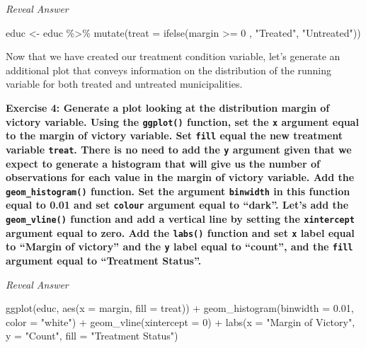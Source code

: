 \documentclass[
  letterpaper,
  DIV=11,
  numbers=noendperiod]{scrreprt}
\newenvironment{Shaded}{\begin{snugshade}}{\end{snugshade}}
\newcommand{\AttributeTok}[1]{\textcolor[rgb]{0.40,0.45,0.13}{#1}}
\newcommand{\DecValTok}[1]{\textcolor[rgb]{0.68,0.00,0.00}{#1}}
\newcommand{\FloatTok}[1]{\textcolor[rgb]{0.68,0.00,0.00}{#1}}
\newcommand{\FunctionTok}[1]{\textcolor[rgb]{0.28,0.35,0.67}{#1}}
\newcommand{\NormalTok}[1]{\textcolor[rgb]{0.00,0.23,0.31}{#1}}
\newcommand{\OtherTok}[1]{\textcolor[rgb]{0.00,0.23,0.31}{#1}}
\newcommand{\SpecialCharTok}[1]{\textcolor[rgb]{0.37,0.37,0.37}{#1}}
\newcommand{\StringTok}[1]{\textcolor[rgb]{0.13,0.47,0.30}{#1}}
\begin{document}
\hfill\break

\emph{Reveal Answer}

\begin{Shaded}
\begin{Highlighting}[]
\NormalTok{educ }\OtherTok{\textless{}{-}}\NormalTok{ educ }\SpecialCharTok{\%\textgreater{}\%} 
  \FunctionTok{mutate}\NormalTok{(}\AttributeTok{treat =} \FunctionTok{ifelse}\NormalTok{(margin }\SpecialCharTok{\textgreater{}=} \DecValTok{0}\NormalTok{ , }\StringTok{"Treated"}\NormalTok{, }\StringTok{"Untreated"}\NormalTok{))}
\end{Highlighting}
\end{Shaded}

Now that we have created our treatment condition variable, let's
generate an additional plot that conveys information on the distribution
of the running variable for both treated and untreated municipalities.

\hfill\break

\textbf{Exercise 4: Generate a plot looking at the distribution margin
of victory variable. Using the \texttt{ggplot()} function, set the
\texttt{x} argument equal to the margin of victory variable. Set
\texttt{fill} equal the new treatment variable \texttt{treat}. There is
no need to add the \texttt{y} argument given that we expect to generate
a histogram that will give us the number of observations for each value
in the margin of victory variable. Add the \texttt{geom\_histogram()}
function. Set the argument \texttt{binwidth} in this function equal to
0.01 and set \texttt{colour} argument equal to ``dark''. Let's add the
\texttt{geom\_vline()} function and add a vertical line by setting the
\texttt{xintercept} argument equal to zero. Add the \texttt{labs()}
function and set \texttt{x} label equal to ``Margin of victory'' and the
\texttt{y} label equal to ``count'', and the \texttt{fill} argument
equal to ``Treatment Status''.}

\hfill\break

\emph{Reveal Answer}

\begin{Shaded}
\begin{Highlighting}[]
\FunctionTok{ggplot}\NormalTok{(educ, }\FunctionTok{aes}\NormalTok{(}\AttributeTok{x =}\NormalTok{ margin, }\AttributeTok{fill =}\NormalTok{ treat)) }\SpecialCharTok{+}
  \FunctionTok{geom\_histogram}\NormalTok{(}\AttributeTok{binwidth =} \FloatTok{0.01}\NormalTok{, }\AttributeTok{color =} \StringTok{"white"}\NormalTok{) }\SpecialCharTok{+} 
  \FunctionTok{geom\_vline}\NormalTok{(}\AttributeTok{xintercept =} \DecValTok{0}\NormalTok{) }\SpecialCharTok{+} 
  \FunctionTok{labs}\NormalTok{(}\AttributeTok{x =} \StringTok{"Margin of Victory"}\NormalTok{, }\AttributeTok{y =} \StringTok{"Count"}\NormalTok{, }\AttributeTok{fill =} \StringTok{"Treatment Status"}\NormalTok{)}
\end{Highlighting}
\end{Shaded}
\end{document}

